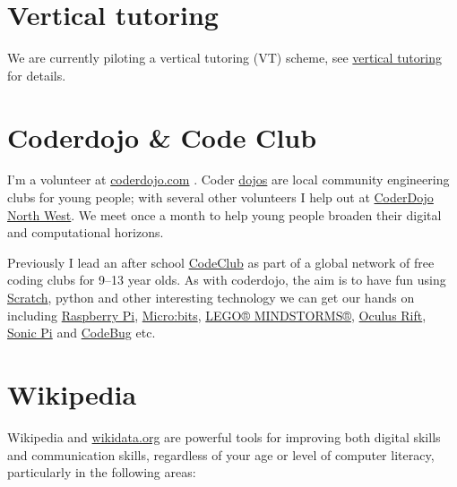 \documentclass[
  12pt,
]{book}
\begin{document}
\hypertarget{vt}{%
\section{Vertical tutoring}\label{vt}}

We are currently piloting a vertical tutoring (VT) scheme, see \protect\hyperlink{vt}{vertical tutoring} for details. \citep{vtbernard, druryvert}

\hypertarget{codeclub}{%
\section{Coderdojo \& Code Club}\label{codeclub}}

I'm a volunteer at \href{https://coderdojo.com/}{coderdojo.com} \citep{coderdojo}. Coder \href{https://en.wikipedia.org/wiki/Dojo}{dojos} are local community engineering clubs for young people; with several other volunteers I help out at \href{https://twitter.com/coderdojonw}{CoderDojo North West}. We meet once a month to help young people broaden their digital and computational horizons.

Previously I lead an after school \href{https://codeclub.org}{CodeClub} as part of a global network of free coding clubs for 9--13 year olds. \citep{codeclub} As with coderdojo, the aim is to have fun using \href{https://scratch.mit.edu/}{Scratch}, \citep{Resnick2009} python and other interesting technology we can get our hands on including \href{https://www.raspberrypi.org/}{Raspberry Pi}, \citep{raspberrypi} \href{https://microbit.org/}{Micro:bits}, \citep{Sentance2017} \href{https://www.lego.com/en-gb/themes/mindstorms}{LEGO® MINDSTORMS®}, \citep{Papert1980, Klassner2003} \href{https://www.oculus.com}{Oculus Rift}, \href{https://sonic-pi.net/}{Sonic Pi} \citep{Aaron2016} and \href{http://www.codebug.org.uk/}{CodeBug} etc.

\hypertarget{wikipedia}{%
\section{Wikipedia}\label{wikipedia}}

Wikipedia and \href{https://www.wikidata.org}{wikidata.org} \citep{Vrandecic2014, Turki2019} are powerful tools for improving both digital skills and communication skills, regardless of your age or level of computer literacy, \citep{Proffitt2018, goodfaith, Littlejohn2019} particularly in the following areas:
\end{document}
